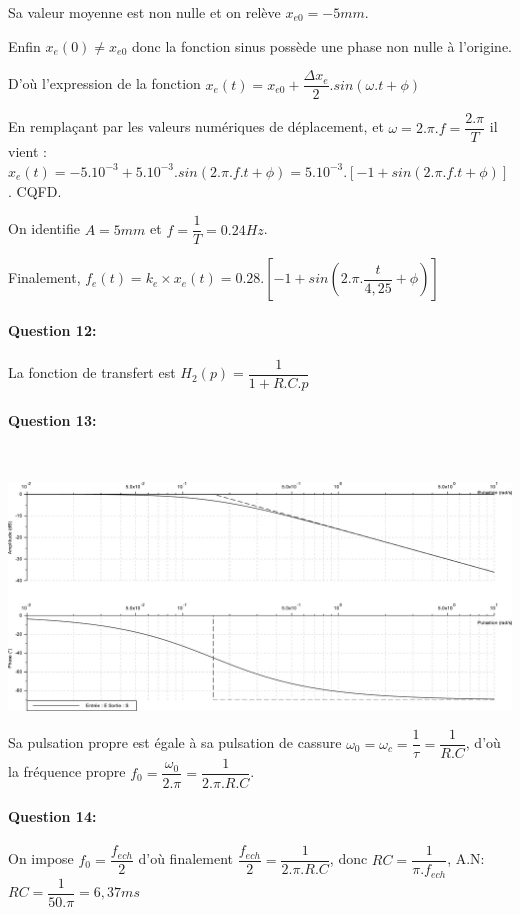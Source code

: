Sa valeur moyenne est non nulle et on relève $x_{e0}=-5mm$.

Enfin $x_e(0)\neq x_{e0}$ donc la fonction sinus possède une phase non nulle à l'origine.

D'où l'expression de la fonction $x_e(t)=x_{e0}+\dfrac{\Delta x_e}{2}.sin(\omega.t+\phi)$

En remplaçant par les valeurs numériques de déplacement, et $\omega=2.\pi.f=\dfrac{2.\pi}{T}$ il vient : $x_e(t)=-5.10^{-3}+5.10^{-3}.sin(2.\pi.f.t+\phi)=5.10^{-3}.[-1+sin(2.\pi.f.t+\phi)]$. CQFD.

On identifie $A=5mm$ et $f=\dfrac{1}{T}=0.24Hz$.

Finalement, $f_e(t)=k_e\times x_e(t)=0.28.\left[-1+sin\left(2.\pi.\dfrac{t}{4,25}+\phi\right)\right]$

\paragraph{Question 12:}

La fonction de transfert est $H_2(p)=\dfrac{1}{1+R.C.p}$

\paragraph{Question 13:} ~\ \\

\begin{center}
 \includegraphics[width=0.7\linewidth]{img/Bode}
\end{center}

Sa pulsation propre est égale à sa pulsation de cassure $\omega_0=\omega_c=\dfrac{1}{\tau}=\dfrac{1}{R.C}$, d'où la fréquence propre $f_0=\dfrac{\omega_0}{2.\pi}=\dfrac{1}{2.\pi.R.C}$.

\paragraph{Question 14:}

On impose $f_0=\dfrac{f_{ech}}{2}$ d'où finalement $\dfrac{f_{ech}}{2}=\dfrac{1}{2.\pi.R.C}$, donc $RC=\dfrac{1}{\pi.f_{ech}}$, A.N: $RC=\dfrac{1}{50.\pi}=6,37ms$


